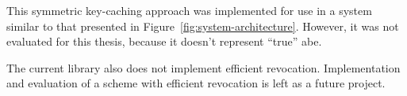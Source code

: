 This symmetric key-caching approach was implemented for use in a system similar to that presented in Figure~\ref{fig:system-architecture}.
However, it was not evaluated for this thesis, because it doesn't represent ``true'' \acrlong{abe}.

The current library also does not implement efficient revocation. 
Implementation and evaluation of a scheme with efficient revocation is left as a future project.

